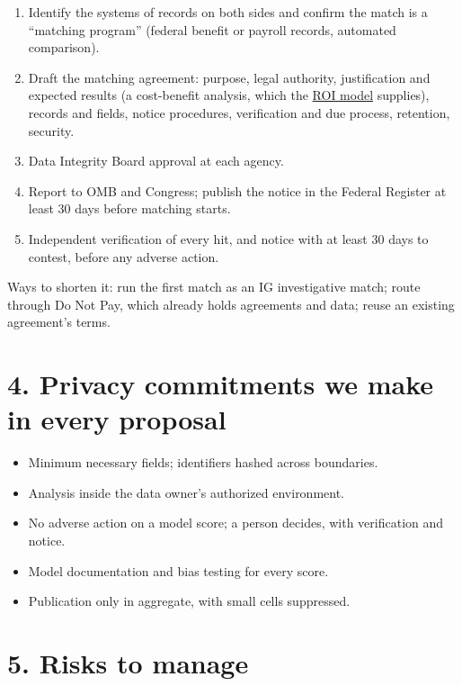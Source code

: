 \documentclass[letterpaper,11pt]{article}
\providecommand{\tightlist}{\setlength{\itemsep}{0pt}\setlength{\parskip}{0pt}}
\begin{document}
\begin{enumerate}
\def\labelenumi{\arabic{enumi}.}
\tightlist
\item
  Identify the systems of records on both sides and confirm the match is
  a ``matching program'' (federal benefit or payroll records, automated
  comparison).
\item
  Draft the matching agreement: purpose, legal authority, justification
  and expected results (a cost-benefit analysis, which the
  \href{../proposals/roi_model.pdf}{ROI model} supplies), records and
  fields, notice procedures, verification and due process, retention,
  security.
\item
  Data Integrity Board approval at each agency.
\item
  Report to OMB and Congress; publish the notice in the Federal Register
  at least 30 days before matching starts.
\item
  Independent verification of every hit, and notice with at least 30
  days to contest, before any adverse action.
\end{enumerate}

Ways to shorten it: run the first match as an IG investigative match;
route through Do Not Pay, which already holds agreements and data; reuse
an existing agreement's terms.

\hypertarget{privacy-commitments-we-make-in-every-proposal}{%
\section*{4. Privacy commitments we make in every
proposal}\label{privacy-commitments-we-make-in-every-proposal}}

\begin{itemize}
\tightlist
\item
  Minimum necessary fields; identifiers hashed across boundaries.
\item
  Analysis inside the data owner's authorized environment.
\item
  No adverse action on a model score; a person decides, with
  verification and notice.
\item
  Model documentation and bias testing for every score.
\item
  Publication only in aggregate, with small cells suppressed.
\end{itemize}

\hypertarget{risks-to-manage}{%
\section*{5. Risks to manage}\label{risks-to-manage}}
\end{document}
